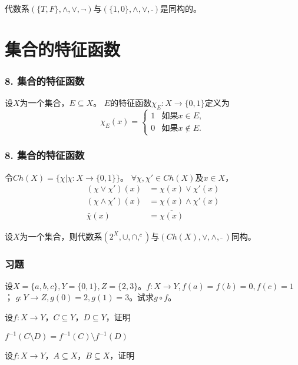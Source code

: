 \documentclass{beamer}
\begin{document}
\begin{CJK*}{UTF8}{gbsn}
\begin{frame}
代数系$(\{T,F\},\land,\lor,\lnot)$与$(\{1,0\},\land, \lor,\bar{ })$是同构的。
\end{frame}

\section{集合的特征函数}
\begin{frame}
  \frametitle{8. 集合的特征函数}
  \begin{Def}
    设$X$为一个集合，$E \subseteq X$。 $E$的\alert{特征函数}$\chi_E:X\to \{0,1\}$定义为
    \begin{equation*}
      \chi_E(x)=
      \begin{cases}
        1 & \text{如果} x \in E,\\
        0 & \text{如果} x \notin E.
      \end{cases}
    \end{equation*}
  \end{Def}
\end{frame}
\begin{frame}
  \frametitle{8. 集合的特征函数}
  \begin{Def}
    令$Ch(X) = \{\chi |\chi:X \to \{0,1\}\}$。
    $\forall \chi, \chi' \in Ch(X)$及$x \in X$，
    \begin{align}
      (\chi \lor \chi')(x) &= \chi(x) \lor \chi'(x)\nonumber\\
      (\chi \land \chi')(x) &= \chi(x) \land \chi'(x)\nonumber\\
      \bar{\chi}(x) &=   \overline{\chi(x)}
    \end{align}
  \end{Def}
  \begin{Thm}
    设$X$为一个集合，则代数系$(2^X, \cup, \cap, ^c)$与$(Ch(X), \lor, \land, \bar{} \ )$同构。
  \end{Thm}
\end{frame}

\begin{frame}
  \frametitle{习题}
    \begin{Exercise}
  设$X=\{a,b,c\}, Y=\{0,1\}, Z=\{2,3\}$。$f:X \to Y, f(a) = f(b) = 0, f(c) = 1$；
  $g:Y\to Z, g(0) = 2, g(1) = 3$。试求$g\circ f$。
  \end{Exercise}
  \begin{Exercise}
    设$f:X \to Y$，$C \subseteq Y$，$D \subseteq Y$，证明

    $f^{-1}(C \setminus D) = f^{-1}(C) \setminus f^{-1}(D)$
  \end{Exercise}
    \begin{Exercise}
    设$f:X \to Y$，$A \subseteq X$，$B \subseteq X$，证明


\end{Exercise}
\end{frame}
\end{CJK*}
\end{document}
